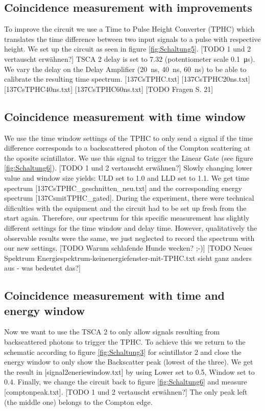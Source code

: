 \subsection{Coincidence measurement with improvements}
%
To improve the circuit we use a Time to Pulse Height Converter (TPHC) which translates the time difference between two input signals to a pulse with respective height.
We set up the circuit as seen in figure \ref{fig:Schaltung5}.
[TODO 1 und 2 vertauscht erwähnen?]
TSCA 2 delay is set to 7.32 (potentiometer scale \SI{0.1}{\micro\second}).
We vary the delay on the Delay Amplifier (\SI{20}{\nano\second}, \SI{40}{\nano\second}, \SI{60}{\nano\second}) to be able to calibrate the resulting time spectrum.
[137CsTPHC.txt]
[137CsTPHC20ns.txt]
[137CsTPHC40ns.txt]
[137CsTPHC60ns.txt]
[TODO Fragen S. 21]
%
\subsection{Coincidence measurement with time window}
%
We use the time window settings of the TPHC to only send a signal if the time difference corresponds to a backscattered photon of the Compton scattering at the oposite scintillator.
We use this signal to trigger the Linear Gate (see figure \ref{fig:Schaltung6}).
[TODO 1 und 2 vertauscht erwähnen?]
Slowly changing lower value and window size yields: ULD set to 1.0 and LLD set to 1.1.
We get time spectrum [137CsTPHC_geschnitten_neu.txt] and the corresponding energy spectrum [137CsmitTPHC_gated].
During the experiment, there were technical dificulties with the equipment and the circuit had to be set up fresh from the start again.
Therefore, our spectrum for this specific measurement has slightly different settings for the time window and delay time.
However, qualitatively the observable results were the same, we just neglected to record the spectrum with our new settings.
[TODO Warum schlafende Hunde wecken? ;-)]
[TODO Neues Spektrum Energiespektrum-keinenergiefenster-mit-TPHC.txt sieht ganz anders aus - was bedeutet das?]
%
\subsection{Coincidence measurement with time and energy window}
%
Now we want to use the TSCA 2 to only allow signals resulting from backscattered photons to trigger the TPHC.
To achieve this we return to the schematic according to figure \ref{fig:Schaltung3} for scintillator 2 and close the energy window to only show the Backscatter peak (lowest of the three).
We get the result in [signal2eneriewindow.txt] by using Lower set to 0.5, Window set to 0.4.
Finally, we change the circuit back to figure \ref{fig:Schaltung6} and measure [comptonpeak.txt].
[TODO 1 und 2 vertauscht erwähnen?]
The only peak left (the middle one) belongs to the Compton edge.
%
